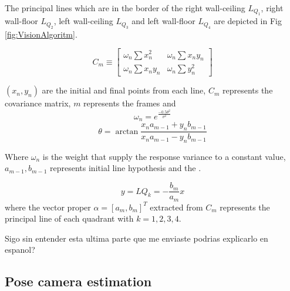 \color{magenta}

The principal lines which are in the border of the right wall-ceiling $L_{Q_1}$, right wall-floor $L_{Q_2}$,
left wall-ceiling $L_{Q_3}$ and left wall-floor $L_{Q_4}$ are depicted in Fig \ref{fig:VisionAlgoritm}.  \vskip 0.2cm



   \begin{equation*}
 C_m\equiv \begin{bmatrix}%
     \omega_n \sum x_n^2   &  \omega_n \sum x_n y_n \\
     \omega_n \sum x_n y_n &  \omega_n \sum y_n^2
    \end{bmatrix}
\end{equation*}

$(x_n,y_n)$ are the initial and final points from each line, $C_m$ represents the covariance matrix, $m$ represents the frames and
\begin{equation*}
 \omega_n=e^{\frac{-0.5 \theta^2}{\sigma^2}}
\end{equation*}
\begin{equation*}
 \theta=\arctan \frac{x_n a_{m-1}+y_n b_{m-1}}{x_n a_{m-1}-y_n b_{m-1}}
\end{equation*}

Where $\omega_n$ is the weight that supply the response variance to a constant value, $a_{m-1}, b_{m-1}$ represents initial line hypothesis and the .


\begin{equation*}
y=LQ_k=-\frac{b_m}{a_m} x
\end{equation*}
where the vector proper  $\alpha=[a_m, b_m]^T$ extracted from $C_m$ represents the principal line of each quadrant with $k=1,2,3,4$.

\color{red}
Sigo sin entender esta ultima parte que me enviaste
podrias explicarlo en espanol?
\color{black}

\subsection{Pose camera estimation}


